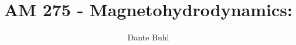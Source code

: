 \documentclass{article}
\begin{document}
\title{AM 275 - Magnetohydrodynamics:}
\author{Dante Buhl}


\newcommand{\wrms}{w_{\text{rms}}}
\newcommand{\bs}[1]{\boldsymbol{#1}}
\newcommand{\tb}[1]{\textbf{#1}}
\newcommand{\bmp}[1]{\begin{minipage}{#1\textwidth}}
\newcommand{\emp}{\end{minipage}}
\newcommand{\R}{\mathbb{R}}
\newcommand{\C}{\mathbb{C}}
\newcommand{\N}{\mathcal{N}}
\newcommand{\K}{\bs{\mathrm{K}}}
\newcommand{\m}{\bs{\mu}_*}
\newcommand{\s}{\bs{\Sigma}_*}
\newcommand{\dt}{\Delta t}
\newcommand{\dx}{\Delta x}
\newcommand{\tr}[1]{\text{Tr}(#1)}
\newcommand{\Tr}[1]{\text{Tr}(#1)}
\newcommand{\Div}{\nabla \cdot}
\renewcommand{\div}{\nabla \cdot}
\newcommand{\Curl}{\nabla \times}
\newcommand{\Grad}{\nabla}
\newcommand{\grad}{\nabla}
\newcommand{\grads}{\nabla_s}
\newcommand{\gradf}{\nabla_f}
\newcommand{\xs}{x_s}
\newcommand{\x}{\bs{x}}
\newcommand{\xf}{x_f}
\newcommand{\ts}{t_s}
\newcommand{\tf}{t_f}
\newcommand{\pt}{\partial t}
\newcommand{\pz}{\partial z}
\newcommand{\uvec}{\bs{u}}
\newcommand{\bvec}{\bs{B}}
\newcommand{\nvec}{\hat{\bs{n}}}
\newcommand{\B}{\bs{B}}
\newcommand{\A}{\bs{A}}
\newcommand{\jvec}{\bs{j}}
\newcommand{\F}{\bs{F}}
\newcommand{\T}{\tilde{T}}
\newcommand{\ez}{\bs{e}_z}
\newcommand{\ex}{\bs{e}_x}
\newcommand{\ey}{\bs{e}_y}
\newcommand{\eo}{\bs{e}_{\bs{\Omega}}}
\newcommand{\ppt}[1]{\frac{\partial #1}{\partial t}}
\newcommand{\pp}[2]{\frac{\partial #1}{\partial #2}}
\newcommand{\pptwo}[2]{\frac{\partial^2 #1}{\partial #2^2}}
\newcommand{\ddtwo}[2]{\frac{d^2 #1}{d #2^2}}
\newcommand{\DDt}[1]{\frac{D #1}{D t}}
\newcommand{\ppts}[1]{\frac{\partial #1}{\partial t_s}}
\newcommand{\pptf}[1]{\frac{\partial #1}{\partial t_f}}
\newcommand{\ppz}[1]{\frac{\partial #1}{\partial z}}
\newcommand{\ddz}[1]{\frac{d #1}{d z}}
\newcommand{\ppzetas}[1]{\frac{\partial^2 #1}{\partial \zeta^2}}
\newcommand{\ppzs}[1]{\frac{\partial #1}{\partial z_s}}
\newcommand{\ppzf}[1]{\frac{\partial #1}{\partial z_f}}
\newcommand{\ppx}[1]{\frac{\partial #1}{\partial x}}
\newcommand{\ddx}[1]{\frac{d #1}{d x}}
\newcommand{\ppxi}[1]{\frac{\partial #1}{\partial x_i}}
\newcommand{\ppxj}[1]{\frac{\partial #1}{\partial x_j}}
\newcommand{\ppy}[1]{\frac{\partial #1}{\partial y}}
\newcommand{\ppzeta}[1]{\frac{\partial #1}{\partial \zeta}}


\maketitle 
\setlength{\parindent}{0pt}
\end{document}
